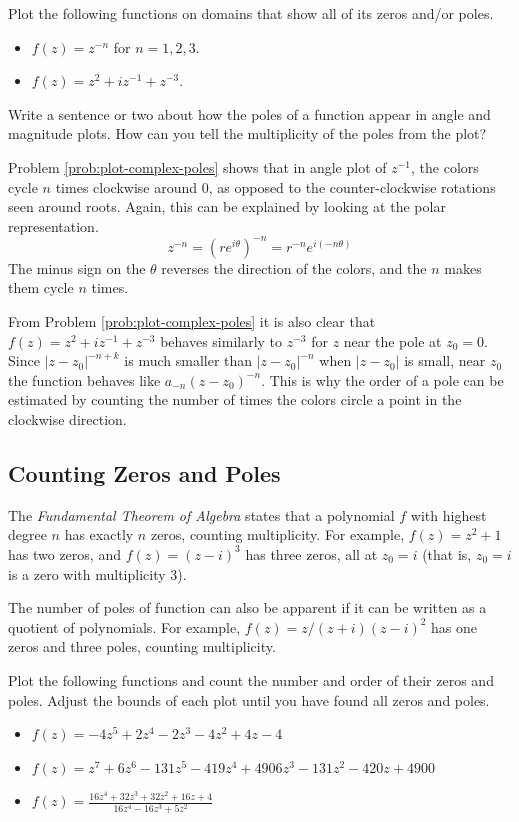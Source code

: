 \begin{problem} %
Plot the following functions on domains that show all of its zeros and/or poles.
\begin{itemize}
\item $f(z) = z^{-n}$ for $n=1,2,3$.
\item $f(z) = z^2+iz^{-1}+z^{-3}$.
\end{itemize}
Write a sentence or two about how the poles of a function appear in angle and magnitude plots.
How can you tell the multiplicity of the poles from the plot?
\label{prob:plot-complex-poles}
\end{problem}

Problem \ref{prob:plot-complex-poles} shows that in angle plot of $z^{-1}$, the colors cycle $n$ times clockwise around $0$, as opposed to the counter-clockwise rotations seen around roots.
Again, this can be explained by looking at the polar representation.
\[
z^{-n} = (re^{i \theta})^{-n} = r^{-n} e^{i(-n\theta)}
\]
The minus sign on the $\theta$ reverses the direction of the colors, and the $n$ makes them cycle $n$ times.

From Problem \ref{prob:plot-complex-poles} it is also clear that $f(z) = z^2+iz^{-1}+z^{-3}$ behaves similarly to $z^{-3}$ for $z$ near the pole at $z_0 = 0$.
Since $|z-z_0|^{-n+k}$ is much smaller than $|z-z_0|^{-n}$ when $|z-z_0|$ is small, near $z_0$ the function behaves like $a_{-n}(z-z_0)^{-n}$.
This is why the order of a pole can be estimated by counting the number of times the colors circle a point in the clockwise direction.

\subsection*{Counting Zeros and Poles} %

The \emph{Fundamental Theorem of Algebra} states that a polynomial $f$ with highest degree $n$ has exactly $n$ zeros, counting multiplicity.
For example, $f(z) = z^2 + 1$ has two zeros, and $f(z) = (z-i)^3$ has three zeros, all at $z_0 = i$ (that is, $z_0=i$ is a zero with multiplicity $3$).

The number of poles of function can also be apparent if it can be written as a quotient of polynomials.
For example, $f(z) = z / (z+i)(z-i)^2$ has one zeros and three poles, counting multiplicity.

\begin{problem}
Plot the following functions and count the number and order of their zeros and poles.
Adjust the bounds of each plot until you have found all zeros and poles.
\begin{itemize}
\item $f(z) = -4z^5 + 2z^4 - 2z^3 - 4z^2 + 4z - 4$
\item $f(z) = z^7 + 6z^6 - 131z^5 - 419z^4 + 4906z^3 - 131z^2 - 420z + 4900$
\item $f(z) = \frac{16z^4 + 32z^3 + 32z^2 + 16z + 4}{16z^4 - 16z^3 + 5z^2}$
\end{itemize}
\end{problem}

